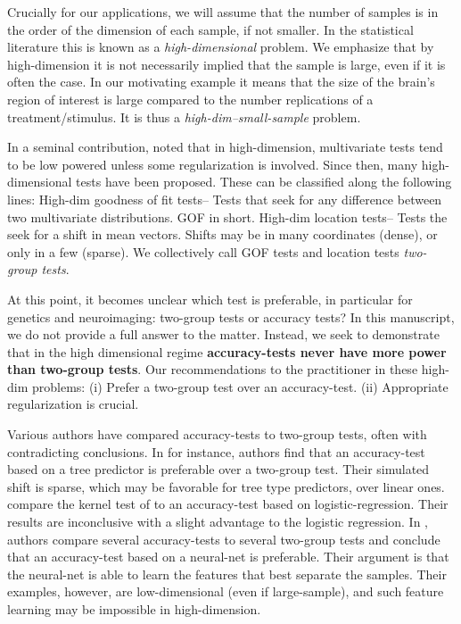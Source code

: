 \documentclass[]{bio}
\begin{document}
Crucially for our applications, we will assume that the number of samples is in the order of the dimension of each sample, if not smaller. 
In the statistical literature this is known as a \emph{high-dimensional} problem. 
We emphasize that by high-dimension it is not necessarily implied that the sample is large, even if it is often the case. 
In our motivating example it means that the size of the brain's region of interest is large compared to the number replications of a treatment/stimulus. 
It is thus a \emph{high-dim--small-sample} problem. 

In a seminal contribution, \citet{bai1996effect} noted that in high-dimension, multivariate tests tend to be low powered unless some regularization is involved. 
Since then, many high-dimensional tests have been proposed. 
These can be classified along the following lines:
High-dim goodness of fit tests-- Tests that seek for any difference between two multivariate distributions. GOF in short.
High-dim location tests-- Tests the seek for a shift in mean vectors. 
Shifts may be in many coordinates (dense), or only in a few (sparse).
We collectively call GOF tests and location tests \emph{two-group tests}. 

At this point, it becomes unclear which test is preferable, in particular for genetics and neuroimaging: two-group tests or accuracy tests?
In this manuscript, we do not provide a full answer to the matter.
Instead, we seek to demonstrate that in the high dimensional regime \textbf{accuracy-tests never have more power than two-group tests}.
Our recommendations to the practitioner in these high-dim problems:
(i) Prefer a two-group test over an accuracy-test. 
(ii) Appropriate regularization is crucial. 

Various authors have compared accuracy-tests to two-group tests, often with contradicting conclusions.
In \cite{yu2007two} for instance, authors find that an accuracy-test based on a tree predictor is preferable over a two-group test. 
Their simulated shift is sparse, which may be favorable for tree type predictors, over linear ones. 
\citet{olivetti2013kernel} compare the kernel test of \cite{gretton_kernel_2012-1} to an accuracy-test based on logistic-regression.
Their results are inconclusive with a slight advantage to the logistic regression.
In \cite{lopez2016revisiting}, authors compare several accuracy-tests to several two-group tests and conclude that an accuracy-test based on a neural-net is preferable. 
Their argument is that the neural-net is able to learn the features that best separate the samples. 
Their examples, however, are low-dimensional (even if large-sample), and such feature learning may be impossible in high-dimension.
\end{document}
